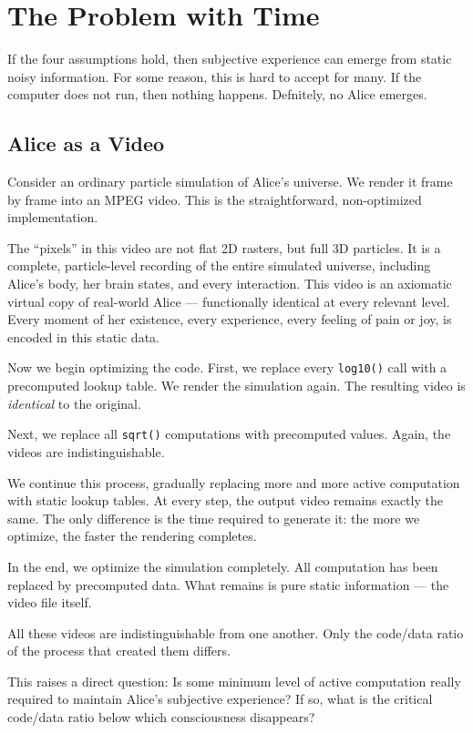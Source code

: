 \chapter{The Problem with Time}

If the four assumptions hold, then subjective experience can emerge from static noisy information. For some reason,
this is hard to accept for many. If the computer does not run, then nothing happens. Defnitely, no Alice emerges.

\section{Alice as a Video}

Consider an ordinary particle simulation of Alice's universe. We render it frame by frame into an MPEG video. This is the straightforward, non-optimized implementation.

The ``pixels'' in this video are not flat 2D rasters, but full 3D particles. It is a complete, particle-level recording of the entire simulated universe, including Alice's body, her brain states, and every interaction. This video is an axiomatic virtual copy of real-world Alice --- functionally identical at every relevant level. Every moment of her existence, every experience, every feeling of pain or joy, is encoded in this static data.

Now we begin optimizing the code. First, we replace every \texttt{log10()} call with a precomputed lookup table. We render the simulation again. The resulting video is \emph{identical} to the original.

Next, we replace all \texttt{sqrt()} computations with precomputed values. Again, the videos are indistinguishable.

We continue this process, gradually replacing more and more active computation with static lookup tables. At every step, the output video remains exactly the same. The only difference is the time required to generate it: the more we optimize, the faster the rendering completes.

In the end, we optimize the simulation completely. All computation has been replaced by precomputed data. What remains is pure static information --- the video file itself.

All these videos are indistinguishable from one another. Only the code/data ratio of the process that created them differs.

This raises a direct question: Is some minimum level of active computation really required to maintain Alice's subjective experience? If so, what is the critical code/data ratio below which consciousness disappears?

